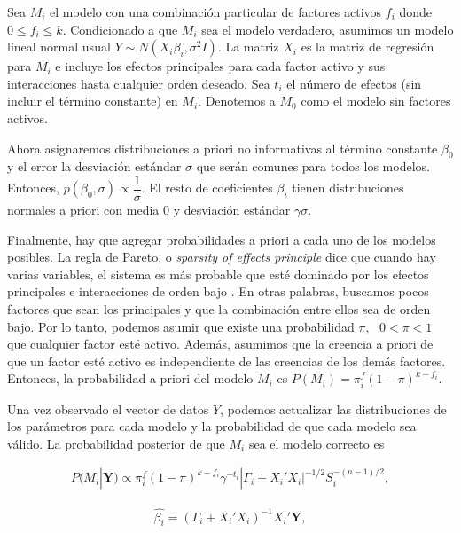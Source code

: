 Sea $M_i$ el modelo con una combinación particular de factores activos $f_i$ donde $0 \leq f_i \leq k$. Condicionado a que $M_i$ sea el modelo verdadero, asumimos un modelo lineal normal usual $\textbf{$Y$} \sim N(X_i \beta_i, \sigma^2 I).$ La matriz $X_i$ es la matriz de regresión para $M_i$ e incluye los efectos principales para cada factor activo y sus interacciones hasta cualquier orden deseado. Sea $t_i$ el número de efectos (sin incluir el término constante) en $M_i$. Denotemos a $M_0$ como el modelo sin factores activos. 

Ahora asignaremos distribuciones a priori no informativas al término constante $\beta_0$ y el error la desviación estándar $\sigma$ que serán comunes para todos los modelos. Entonces, $p( \beta_0, \sigma) \propto \dfrac{1}{\sigma}$. El resto de coeficientes $\beta_i$ tienen distribuciones normales a priori con media 0 y desviación estándar $\gamma \sigma$. 

Finalmente, hay que agregar probabilidades a priori a cada uno de los modelos posibles. La regla de Pareto, o \textit{sparsity of effects principle} dice que cuando hay varias variables, el sistema es más probable que esté dominado por los efectos principales e interacciones de orden bajo \cite{montgomery2017design}. En otras palabras, buscamos pocos factores que sean los principales y que la combinación entre ellos sea de orden bajo. Por lo tanto, podemos asumir que existe una probabilidad $\pi, \text{ } 0 < \pi < 1$ que cualquier factor esté activo. Además, asumimos que la creencia a priori de que un factor esté activo es independiente de las creencias de los demás factores. Entonces, la probabilidad a priori del modelo $M_i$ es $P(M_i) = \pi ^f_i (1 - \pi)^{k-f_i}.$ 

Una vez observado el vector de datos \textbf{$Y$}, podemos actualizar las distribuciones de los parámetros para cada modelo y la probabilidad de que cada modelo sea válido. La probabilidad posterior de que $M_i$ sea el modelo correcto es 

\begin{equation*}
	\begin{aligned}
		P(M_i | \textbf{Y}) \propto  \pi ^f_i (1 - \pi)^{k-f_i} \gamma^{-t_i} |\Gamma_i + X_i' X_i |^{-1/2} S_i^{-(n-1)/2}, 		
	\end{aligned}
\end{equation*}

\begin{equation*}
	\begin{aligned}
		\hat{\beta_i} = (\Gamma_i + X_i' X_i)^{-1} X_i ' \textbf{Y}, 
	\end{aligned}
\end{equation*}

